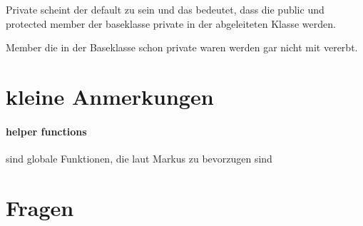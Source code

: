 \documentclass[paper=a4,10pt]{scrartcl}
\begin{document}
Private scheint der default zu sein und das bedeutet, dass die public und protected member der baseklasse private in der abgeleiteten Klasse werden.

Member die in der Baseklasse schon private waren werden gar nicht mit vererbt.

\section{kleine Anmerkungen}
\paragraph{helper functions} sind globale Funktionen, die laut Markus zu bevorzugen sind

\section{Fragen}
\end{document}
